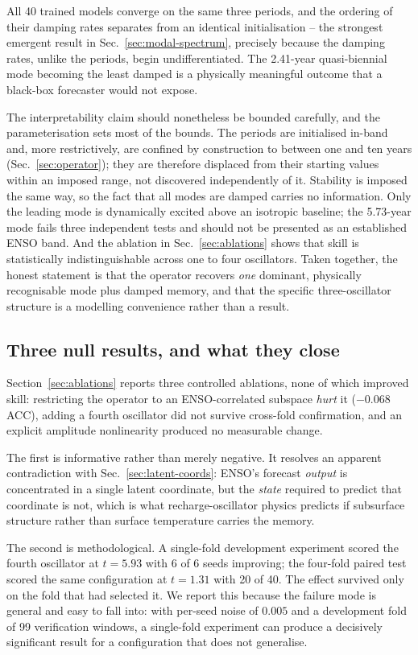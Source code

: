 All 40 trained models converge on the same three periods, and the ordering of their damping
rates separates from an identical initialisation -- the strongest emergent result in
Sec.~\ref{sec:modal-spectrum}, precisely because the damping rates, unlike the periods, begin
undifferentiated. The 2.41-year quasi-biennial mode becoming the least damped is a physically
meaningful outcome that a black-box forecaster would not expose.

The interpretability claim should nonetheless be bounded carefully, and the parameterisation
sets most of the bounds. The periods are initialised in-band and, more restrictively, are
confined by construction to between one and ten years (Sec.~\ref{sec:operator}); they are
therefore displaced from their starting values within an imposed range, not discovered
independently of it. Stability is imposed the same way, so the fact that all modes are damped
carries no information. Only the leading mode is dynamically excited above an isotropic
baseline; the 5.73-year mode fails three independent tests and should not be presented as an
established ENSO band. And the ablation in Sec.~\ref{sec:ablations} shows that skill is
statistically indistinguishable across one to four oscillators. Taken together, the honest
statement is that the operator recovers \emph{one} dominant, physically recognisable mode plus
damped memory, and that the specific three-oscillator structure is a modelling convenience
rather than a result.

\subsection{Three null results, and what they close}

Section~\ref{sec:ablations} reports three controlled ablations, none of which improved skill:
restricting the operator to an ENSO-correlated subspace \emph{hurt} it ($-0.068$ ACC), adding a
fourth oscillator did not survive cross-fold confirmation, and an explicit amplitude
nonlinearity produced no measurable change.

The first is informative rather than merely negative. It resolves an apparent contradiction
with Sec.~\ref{sec:latent-coords}: ENSO's forecast \emph{output} is concentrated in a single
latent coordinate, but the \emph{state} required to predict that coordinate is not, which is
what recharge-oscillator physics predicts if subsurface structure rather than surface
temperature carries the memory.

The second is methodological. A single-fold development experiment scored the fourth oscillator
at $t=5.93$ with 6 of 6 seeds improving; the four-fold paired test scored the same
configuration at $t=1.31$ with 20 of 40. The effect survived only on the fold that had selected
it. We report this because the failure mode is general and easy to fall into: with per-seed
noise of $0.005$ and a development fold of 99 verification windows, a single-fold experiment
can produce a decisively significant result for a configuration that does not generalise.

